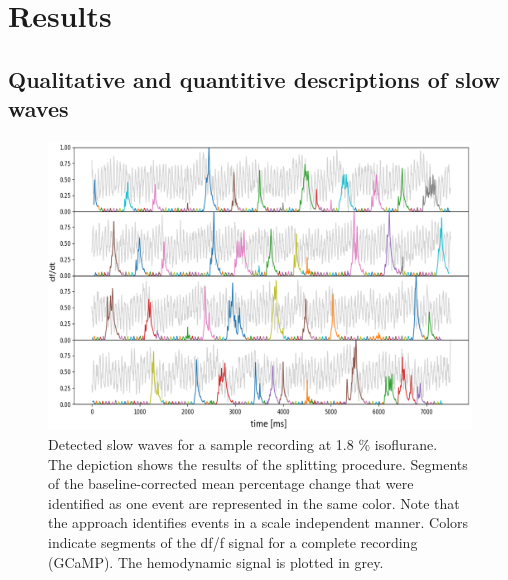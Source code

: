 
\chapter{Results} %

\section{Qualitative and quantitive descriptions of slow waves}
\begin{figure}[!htb]
\centering
\includegraphics[width=\textwidth,height=\textheight,keepaspectratio]{Figures/slow_wave_segmentation}
\decoRule
\caption[Detected slow waves for a sample recording]{Detected slow waves for a sample recording at 1.8 \% isoflurane.\\ The depiction shows the results of the splitting procedure. Segments of the baseline-corrected mean percentage change that were identified as one event are represented in the same color. Note that the approach identifies events in a scale independent manner. Colors indicate segments of the df/f signal for a complete recording (GCaMP). The hemodynamic signal is plotted in grey.}
\label{fig:slow_wave_segmentation}
\end{figure}

\label{Chapter4} %

